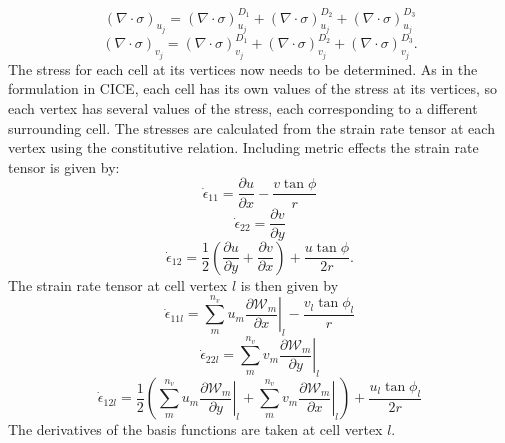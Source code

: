 \begin{equation}
(\nabla \cdot \sigma)_{u_j} = (\nabla \cdot \sigma)_{u_j}^{D_1} + (\nabla \cdot \sigma)_{u_j}^{D_2} + (\nabla \cdot \sigma)_{u_j}^{D_3}
\end{equation}
\begin{equation}
(\nabla \cdot \sigma)_{v_j} = (\nabla \cdot \sigma)_{v_j}^{D_1} + (\nabla \cdot \sigma)_{v_j}^{D_2} + (\nabla \cdot \sigma)_{v_j}^{D_3}.
\end{equation}
The stress for each cell at its vertices now needs to be determined. As in the formulation in CICE, each cell has its own values of the stress at its vertices, so each vertex has several values of the stress, each corresponding to a different surrounding cell. The stresses are calculated from the strain rate tensor at each vertex using the constitutive relation. Including metric effects \citep{Batchelor67} the strain rate tensor is given by:
\begin{equation}
\dot{\epsilon}_{11} = \frac{\partial{u}}{\partial{x}} - \frac{v \tan{\phi}}{r}
\end{equation}
\begin{equation}
\dot{\epsilon}_{22} = \frac{\partial{v}}{\partial{y}}
\end{equation}
\begin{equation}
\dot{\epsilon}_{12} = \frac{1}{2} \left( \frac{\partial{u}}{\partial{y}} + \frac{\partial{v}}{\partial{x}} \right) + \frac{u \tan{\phi}}{2 r}.
\end{equation}
The strain rate tensor at cell vertex $l$ is then given by 
\begin{equation}
\dot{\epsilon}_{11{l}} =  \sum_{m}^{n_v} u_{m} \left. \frac{\partial{\mathcal{W}_{m}}}{\partial{x}} \right| _{l} - \frac{v_{l} \tan{\phi_{l}}}{r}
\end{equation}
\begin{equation}
\dot{\epsilon}_{22{l}} =  \sum_{m}^{n_v} v_{m} \left. \frac{\partial{\mathcal{W}_{m}}}{\partial{y}} \right| _{l} 
\end{equation}
\begin{equation}
\dot{\epsilon}_{12{l}} = \frac{1}{2} \left( \sum_{m}^{n_v} u_{m} \left. \frac{\partial{\mathcal{W}_{m}}}{\partial{y}} \right| _{l} +\sum_{m}^{n_v} v_{m} \left. \frac{\partial{\mathcal{W}_{m}}}{\partial{x}} \right| _{l}  \right) + \frac{u_{l} \tan{\phi_{l}}}{2 r}
\end{equation}
The derivatives of the basis functions are taken at cell vertex $l$.

